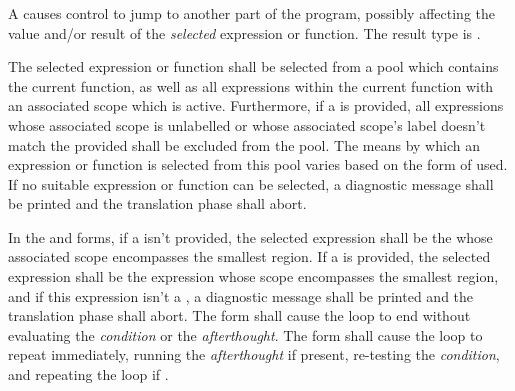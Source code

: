 \begin{grammar}
 \\
	  \\
	  \\
	  \\
	 \\

 \\
	 \\
	  \\
	  \\
	  \terminal{,}  \\
\end{grammar}

\specsubsubitem
A  causes control to jump to another part of the
program, possibly affecting the value and/or result of the \textit{selected}
expression or function. The result type is .

\specsubsubitem
The selected expression or function shall be selected from a pool which contains
the current function, as well as all expressions within the current function
with an associated scope which is active. Furthermore, if a 
is provided, all expressions whose associated scope is unlabelled or whose
associated scope's label doesn't match the provided  shall be
excluded from the pool. The means by which an expression or function is selected
from this pool varies based on the form of 
used. If no suitable expression or function can be selected, a diagnostic
message shall be printed and the translation phase shall abort.

\specsubsubitem
In the  and  forms, if a 
isn't provided, the selected expression shall be the 
whose associated scope encompasses the smallest region. If a 
is provided, the selected expression shall be the expression whose scope
encompasses the smallest region, and if this expression isn't a
, a diagnostic message shall be printed and the
translation phase shall abort. The  form shall cause the loop to
end without evaluating the \textit{condition} or the \textit{afterthought}. The
 form shall cause the loop to repeat immediately, running the
\textit{afterthought} if present, re-testing the \textit{condition}, and
repeating the loop if .

